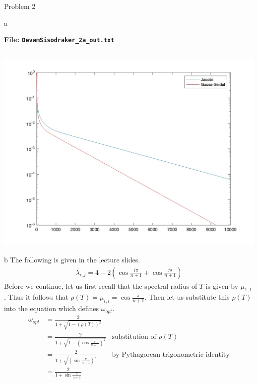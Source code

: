 \begin{section}{Problem 2}
\begin{solution}{a}
        \continued

        \begin{mdframed}
            \footnotesize
            \textbf{File: {\tt DevamSisodraker\_2a\_out.txt}}
            \inputminted{matlab}{DevamSisodraker_2a_out.txt}
            \normalfont
        \end{mdframed}

        \continued

        \begin{mdframed}[]
            \includegraphics[scale=0.33]{DevamSisodraker_2a.jpg}
        \end{mdframed}

    \end{solution}

    \newpage
    
    \begin{solution}{b}
        The following is given in the lecture slides.
        \begin{align*}
            \lambda_{i,j} = 4 - 2 \left( \cos \frac{i \pi}{n + 1} + \cos \frac{j \pi}{n + 1} \right)
        \end{align*}
        Before we continue, let us first recall that the spectral radius of $T$ is given by $\mu_{1,1}$. Thus it follows that $\rho(T) = \mu_{i,i} = \cos \frac{\pi}{n + 1}$. Then let us substitute this $\rho(T)$ into the equation which defines $\omega_{opt}$.
        \begin{align*}
            \omega_{opt} &= \frac{2}{1 + \sqrt{1 - \left( \rho(T) \right)^2}} \\
            &= \frac{2}{1 + \sqrt{1 - \left( \cos \frac{\pi}{n + 1} \right)^2}} & \text{substitution of $\rho(T)$}\\
            &= \frac{2}{1 + \sqrt{\left( \sin \frac{\pi}{n + 1} \right)^2}} & \text{by Pythagorean trigonometric identity} \\
            &= \frac{2}{1 + \sin \frac{\pi}{n + 1}} & \\
        \end{align*}
    \end{solution}


\end{section}
